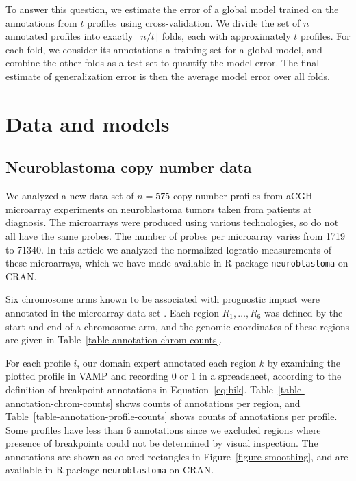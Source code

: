 \documentclass{bioinfo}
\newcommand{\package}[1]{\texttt{#1}}
\begin{document}
\begin{methods}
To answer this question, we estimate the error of a global model
trained on the annotations from $t$ profiles using
cross-validation. We divide the set of $n$ annotated profiles into
exactly $\lfloor n/t \rfloor$ folds, each with approximately $t$
profiles. For each fold, we consider its annotations a training set
for a global model, and combine the other folds as a test set to
quantify the model error. The final estimate of generalization error
is then the average model error over all folds.



\section{Data and models}

\subsection{Neuroblastoma copy number data}\label{data}

We analyzed a new data set of $n=575$ copy number profiles from aCGH
microarray experiments on neuroblastoma tumors taken from patients at
diagnosis. The microarrays were produced using various technologies,
so do not all have the same probes. The number of probes per
microarray varies from 1719 to 71340. In this article we analyzed the
normalized logratio measurements of these microarrays, which we have
made available in R package \package{neuroblastoma} on CRAN.




Six chromosome arms known to be associated with prognostic impact were
annotated in the microarray data set \citep{isabelle-2009}. Each
region $R_1,\dots,R_6$ was defined by the start and end of a
chromosome arm, and the genomic coordinates of these regions are given
in Table~\ref{table-annotation-chrom-counts}.

For each profile $i$, our domain expert annotated each region $k$ by
examining the plotted profile in VAMP \citep{vamp} and recording 0 or
1 in a spreadsheet, according to the definition of breakpoint
annotations in Equation~\ref{eq:bik}.
Table~\ref{table-annotation-chrom-counts} shows counts of annotations
per region, and Table~\ref{table-annotation-profile-counts} shows
counts of annotations per profile. Some profiles have less than 6
annotations since we excluded regions where presence of breakpoints
could not be determined by visual inspection. The annotations are
shown as colored rectangles in Figure~\ref{figure-smoothing}, and are
available in R package \package{neuroblastoma} on CRAN.






\end{methods}
\end{document}
